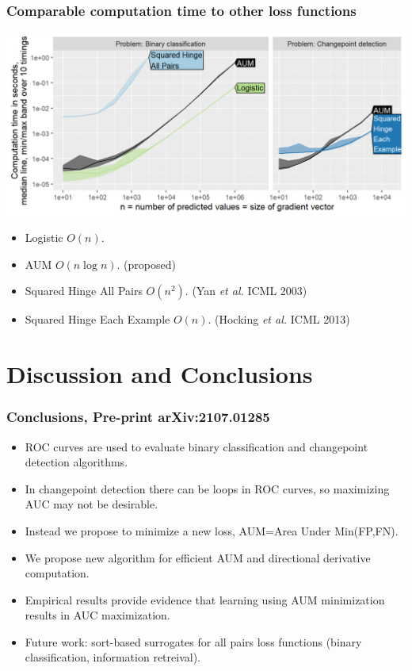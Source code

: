\documentclass[t]{beamer}
\begin{document}
\begin{frame}
  \frametitle{Comparable computation time to other loss functions}

\includegraphics[width=\textwidth]{figure-aum-grad-speed-both.png}

\begin{itemize}
\item Logistic $O(n)$. 
\item AUM $O(n\log n)$. (proposed)
\item Squared Hinge All Pairs $O(n^2)$. (Yan \emph{et al.} ICML 2003)
\item Squared Hinge Each Example $O(n)$. (Hocking \emph{et al.} ICML 2013)
\end{itemize}
  
\end{frame}

\section{Discussion and Conclusions}

\begin{frame}
  \frametitle{Conclusions, Pre-print arXiv:2107.01285}
  \begin{itemize}
  \item ROC curves are used to evaluate binary classification and
    changepoint detection algorithms.
  \item In changepoint detection there can be loops in ROC curves, so
    maximizing AUC may not be desirable.
  \item Instead we propose to minimize a new loss, AUM=Area
    Under Min(FP,FN).
  \item We propose new algorithm for efficient AUM and directional
    derivative computation.
  \item Empirical results provide evidence that learning using AUM
    minimization results in AUC maximization.
  \item Future work: sort-based surrogates for all pairs loss
    functions (binary classification, information retreival).
  \end{itemize}
\end{frame}
\end{document}
